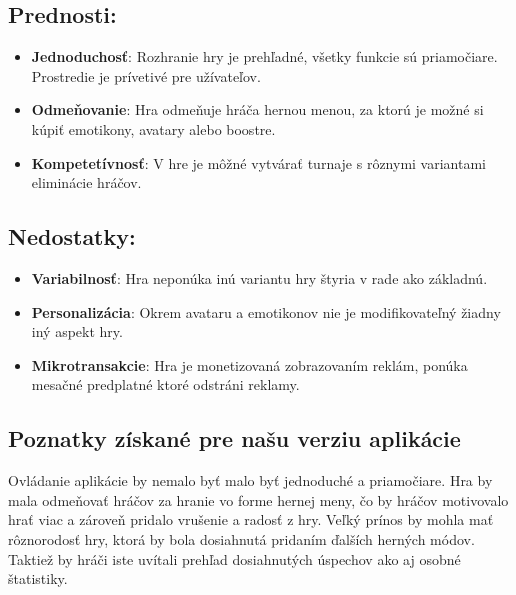 \documentclass[a4paper, 11pt, onecolumn]{article}
\begin{document}
\subsection*{Prednosti:}
\begin{itemize}
  \item \textbf{Jednoduchosť}: Rozhranie hry je prehľadné, všetky funkcie sú priamočiare. Prostredie je prívetivé pre užívateľov.
  \item \textbf{Odmeňovanie}: Hra odmeňuje hráča hernou menou, za ktorú je možné si kúpiť emotikony, avatary alebo boostre.
  \item \textbf{Kompetetívnosť}: V hre je môžné vytvárať turnaje s rôznymi variantami eliminácie hráčov.
\end{itemize}
\subsection*{Nedostatky:}
\begin{itemize}
  \item \textbf{Variabilnosť}: Hra neponúka inú variantu hry štyria v rade ako základnú.
  \item \textbf{Personalizácia}: Okrem avataru a emotikonov nie je modifikovateľný žiadny iný aspekt hry.
  \item \textbf{Mikrotransakcie}: Hra je monetizovaná zobrazovaním reklám, ponúka mesačné predplatné ktoré odstráni reklamy.
\end{itemize}
\subsection*{Poznatky získané pre našu verziu aplikácie}
Ovládanie aplikácie by nemalo byť malo byť jednoduché a priamočiare. Hra by mala odmeňovať hráčov za hranie vo forme 
hernej meny, čo by hráčov motivovalo hrať viac a zároveň pridalo vrušenie a radosť z hry. Veľký prínos by mohla mať rôznorodosť hry, 
ktorá by bola dosiahnutá pridaním ďalších herných módov. Taktiež by hráči iste uvítali prehľad dosiahnutých úspechov ako aj osobné štatistiky.
\end{document}
